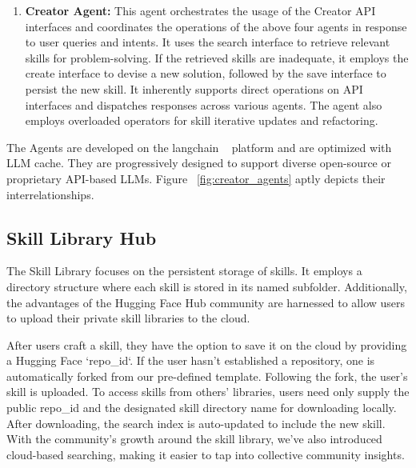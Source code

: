 \begin{enumerate}
    \item \textbf{Creator Agent:} This agent orchestrates the usage of the Creator API interfaces and coordinates the operations of the above four agents in response to user queries and intents. It uses the search interface to retrieve relevant skills for problem-solving. If the retrieved skills are inadequate, it employs the create interface to devise a new solution, followed by the save interface to persist the new skill. It inherently supports direct operations on API interfaces and dispatches responses across various agents. The agent also employs overloaded operators for skill iterative updates and refactoring.
\end{enumerate}

The Agents are developed on the langchain ~\cite{langchain} platform and are optimized with LLM cache. They are progressively designed to support diverse open-source or proprietary API-based LLMs.  Figure ~\ref{fig:creator_agents} aptly depicts their interrelationships.

\subsection{Skill Library Hub}

The Skill Library focuses on the persistent storage of skills. It employs a directory structure where each skill is stored in its named subfolder. Additionally, the advantages of the Hugging Face Hub community are harnessed to allow users to upload their private skill libraries to the cloud.

After users craft a skill, they have the option to save it on the cloud by providing a Hugging Face `repo\_id`. If the user hasn't established a repository, one is automatically forked from our pre-defined template. Following the fork, the user's skill is uploaded. To access skills from others' libraries, users need only supply the public repo\_id and the designated skill directory name for downloading locally. After downloading, the search index is auto-updated to include the new skill. With the community's growth around the skill library, we've also introduced cloud-based searching, making it easier to tap into collective community insights.

